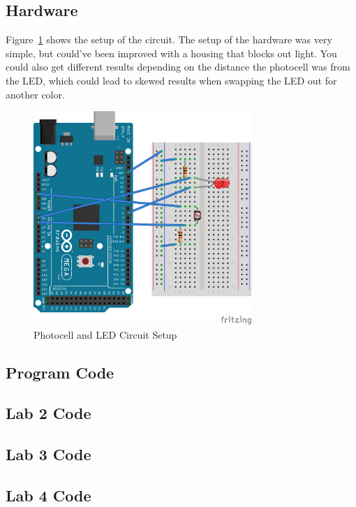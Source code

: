 \documentclass[12pt,titlepage]{article}
\begin{document}
\subsection{Hardware}
Figure~\ref{fig:lab_4_schem} shows the setup of the circuit. The setup of the hardware was very simple, but
could've been improved with a housing that blocks out light. You could also get different results depending
on the distance the photocell was from the LED, which could lead to skewed results when swapping the LED out
for another color.
\begin{figure}[!htb]
    \centering
    \includegraphics[width=3.25in]{lab_4/schematic.png}
    \caption{Photocell and LED Circuit Setup}\label{fig:lab_4_schem}
\end{figure}
\clearpage
\begin{appendices}
  \section{Program Code}
  \subsection{Lab 2 Code}
  \begin{minipage}{\linewidth}
    
  \end{minipage} 
  \subsection{Lab 3 Code}
    
  \subsection{Lab 4 Code}
    
\end{appendices}
\end{document}
